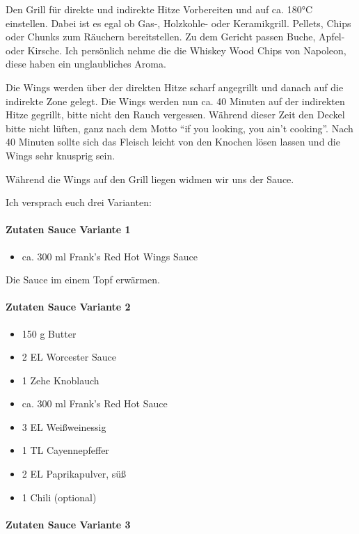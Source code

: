 Den Grill für direkte und indirekte Hitze Vorbereiten und auf ca. 180°C einstellen. 
Dabei ist es 
egal ob Gas-, Holzkohle- oder Keramikgrill. 
Pellets, Chips oder Chunks zum Räuchern bereitstellen. Zu dem Gericht passen 
Buche, Apfel- 
oder Kirsche. Ich persönlich nehme die die 
Whiskey Wood Chips von Napoleon, diese haben ein unglaubliches Aroma.


Die Wings werden über der direkten Hitze scharf angegrillt und danach auf die 
indirekte Zone 
gelegt. Die Wings werden nun  ca. 40 
Minuten auf der indirekten Hitze gegrillt, bitte nicht den Rauch vergessen. 
Während dieser Zeit 
den Deckel bitte nicht lüften, ganz nach 
dem Motto "`if you looking, you ain't cooking"'. Nach 40 Minuten sollte sich das 
Fleisch leicht 
von den Knochen lösen lassen und die 
Wings sehr knusprig sein.

Während die Wings auf den Grill liegen widmen wir uns der Sauce.

Ich versprach euch drei Varianten:

\paragraph{Zutaten Sauce Variante 1}

\begin{itemize}[noitemsep]
	\item ca. 300 ml Frank's Red Hot Wings Sauce
\end{itemize}

Die Sauce im einem Topf erwärmen.

\paragraph{Zutaten Sauce Variante 2}

\begin{itemize}[noitemsep]
	\item 150 g Butter
	\item 2 EL Worcester Sauce
	\item 1 Zehe Knoblauch
	\item ca. 300 ml Frank's Red Hot Sauce
	\item 3 EL Weißweinessig
	\item 1 TL Cayennepfeffer
	\item 2 EL Paprikapulver, süß
	\item 1 Chili (optional)
\end{itemize}

\paragraph{Zutaten Sauce Variante 3}

